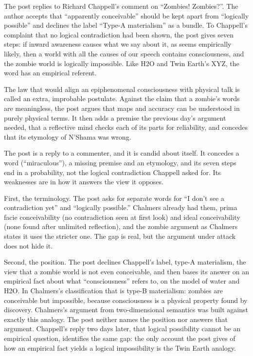 \begin{afterword}
\summaryhead

The post replies to Richard Chappell's comment on ``Zombies! Zombies?''. The author accepts that ``apparently conceivable'' should be kept apart from ``logically possible'' and declines the label ``Type-A materialism'' as a bundle. To Chappell's complaint that no logical contradiction had been shown, the post gives seven steps: if inward awareness causes what we say about it, as seems empirically likely, then a world with all the causes of our speech contains consciousness, and the zombie world is logically impossible. Like H2O and Twin Earth's XYZ, the word has an empirical referent.

The law that would align an epiphenomenal consciousness with physical talk is called an extra, improbable postulate. Against the claim that a zombie's words are meaningless, the post argues that maps and accuracy can be understood in purely physical terms. It then adds a premise the previous day's argument needed, that a reflective mind checks each of its parts for reliability, and concedes that its etymology of N'Shama was wrong.

\responsehead

The post is a reply to a commenter, and it is candid about itself. It concedes a word (``miraculous''), a missing premise and an etymology, and its seven steps end in a probability, not the logical contradiction Chappell asked for. Its weaknesses are in how it answers the view it opposes.

First, the terminology. The post asks for separate words for ``I don't see a contradiction yet'' and ``logically possible.'' Chalmers already had them, prima facie conceivability (no contradiction seen at first look) and ideal conceivability (none found after unlimited reflection), and the zombie argument as Chalmers states it uses the stricter one. The gap is real, but the argument under attack does not hide it.

Second, the position. The post declines Chappell's label, type-A materialism, the view that a zombie world is not even conceivable, and then bases its answer on an empirical fact about what ``consciousness'' refers to, on the model of water and H2O. In Chalmers's classification that is type-B materialism: zombies are conceivable but impossible, because consciousness is a physical property found by discovery. Chalmers's argument from two-dimensional semantics was built against exactly this analogy. The post neither names the position nor answers that argument. Chappell's reply two days later, that logical possibility cannot be an empirical question, identifies the same gap: the only account the post gives of how an empirical fact yields a logical impossibility is the Twin Earth analogy.


\end{afterword}
